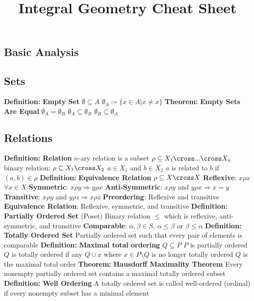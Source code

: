\documentclass[14pt]{extarticle}
\title{Integral Geometry Cheat Sheet}
\def\Definition{{\color{blue} \textbf{Definition:} }}
\def\Theorem{{\color{red} \textbf{Theorem:} }}
\begin{document}
	\maketitle	
	\begin{outline}	
		\section*{Basic Analysis}
		\subsection*{Sets}
		\1	\Definition \textbf{Empty Set}
			\2	$\emptyset \subseteq A$
			\2	$\emptyset_A \coloneqq \{x \in A | x \ne x\}$
		\1	\Theorem \textbf{Empty Sets Are Equal}
			\2	$\emptyset_A = \emptyset_B$
			\2	$\emptyset_A \subseteq \emptyset_B$
			\2	$\emptyset_B \subseteq \emptyset_A$
		\subsection*{Relations}
		\1	\Definition \textbf{Relation}
			\2	$n$-ary relation is a subset $\rho \subseteq X_1 \cross ... \cross X_n$
			\2	binary relation: $\rho \subseteq X_1 \cross X_2$
				\3	$a \in X_1$ and $b \in X_2$
				\2	$a$ is related to $b$ if $(a,b) \in \rho$
		\1	\Definition \textbf{Equivalence Relation}
			\2	$\rho \subseteq X \cross X$ 
			\2	\textbf{Reflexive}: $x \rho x$ $\forall x \in X$
			\2	\textbf{Symmetric}: $x \rho y \Rightarrow y \rho x$
			\2	\textbf{Anti-Symmetric}: $x \rho y$ and $y \rho x \Rightarrow x = y$
			\2	\textbf{Transitive}: $x \rho y$ and $y \rho z \Rightarrow x \rho z$
			\2	\textbf{Preordering}: Reflexive and transitive
			\2	\textbf{Equivalence Relation}: Reflexive, symmetric, and transitive
		\1	\Definition \textbf{Partially Ordered Set} (Poset)
			\2	Binary relation $\le$ which is reflexive, anti-symmetric, and transitive
			\2	\textbf{Comparable}: $\alpha, \beta \in S$, $\alpha \le \beta$ or $\beta \le \alpha$
		\1	\Definition \textbf{Totally Ordered Set}
			\2	Partially ordered set such that every pair of elements is comparable
		\1	\Definition \textbf{Maximal total ordering}
			\2	$Q \subseteq P$
			\2	$P$ is partially ordered
			\2	$Q$ is totally ordered
			\2	if any $Q \cup x$ where $x \in P \setminus Q$ is no longer totally ordered
			\2	$Q$ is the maximal total order
		\1	\Theorem \textbf{Hausdorff Maximality Theorem}
			\2	Every nonempty partially ordered set contains a maximal totally ordered subset
		\1	\Definition \textbf{Well Ordering}
			\2	A totally ordered set is called well-ordered (ordinal) if every nonempty
					subset has a minimal element


\end{outline}
\end{document}
